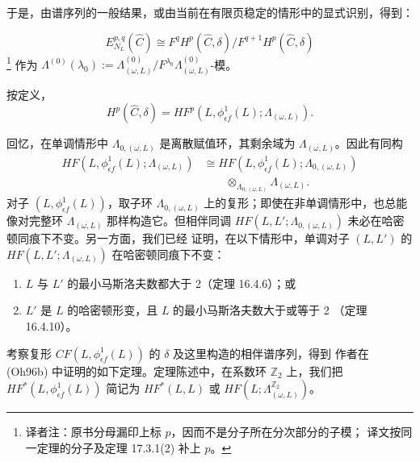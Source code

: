 于是，由谱序列的一般结果，或由当前在有限页稳定的情形中的显式识别，得到：

\begin{theorem}
\label{thm:finite-page-associated-graded}
\[
 E_{N_L}^{p,q}(\widehat C)\cong
 F^qH^p(\widehat C,\delta)/F^{q+1}H^p(\widehat C,\delta)
\]
\footnote{译者注：原书分母漏印上标 $p$，因而不是分子所在分次部分的子模；
译文按同一定理的分子及定理 17.3.1(2) 补上 $p$。}
作为
$\Lambda^{(0)}(\lambda_0):=\Lambda_{(\omega,L)}^{(0)}
/F^{\lambda_0}\Lambda_{(\omega,L)}^{(0)}$-模。
\end{theorem}

按定义，
\[
 H^p(\widehat C,\delta)=
 HF^p(L,\phi_{\epsilon f}^1(L);\Lambda_{(\omega,L)}).
\]

\begin{remark}
\label{rem:novikov-residue-field}
回忆，在单调情形中 $\Lambda_{0,(\omega,L)}$ 是离散赋值环，其剩余域为
$\Lambda_{(\omega,L)}$。因此有同构
\begin{equation}
 \begin{aligned}
 HF(L,\phi_{\epsilon f}^1(L);\Lambda_{(\omega,L)})
 &\cong HF(L,\phi_{\epsilon f}^1(L);\Lambda_{0,(\omega,L)})\\
 &\qquad\otimes_{\Lambda_{0,(\omega,L)}}\Lambda_{(\omega,L)}.
 \end{aligned}
\label{eq:17-novikov-base-change}
\end{equation}
对子 $(L,\phi_{\epsilon f}^1(L))$，取子环 $\Lambda_{0,(\omega,L)}$ 上的\personFloer{}复形；即使在非单调情形中，也总能像对完整\personNovikov{}环
$\Lambda_{(\omega,L)}$ 那样构造它。但相伴同调
$HF(L,L';\Lambda_{0,(\omega,L)})$ 未必在哈密顿同痕下不变。另一方面，我们已经
证明，在以下情形中，单调对子 $(L,L')$ 的
$HF(L,L';\Lambda_{(\omega,L)})$ 在哈密顿同痕下不变：
\begin{enumerate}[label=(\arabic*)]
\item $L$ 与 $L'$ 的最小马斯洛夫数都大于 2（定理 16.4.6）；或
\item $L'$ 是 $L$ 的哈密顿形变，且 $L$ 的最小马斯洛夫数大于或等于 2
（定理 16.4.10）。
\end{enumerate}
\end{remark}

考察复形 $CF(L,\phi_{\epsilon f}^1(L))$ 的 $\delta$ 及这里构造的相伴谱序列，得到
作者在 (Oh96b) 中证明的如下定理。定理陈述中，在系数环 $\mathbb Z_2$ 上，我们把
$HF^*(L,\phi_{\epsilon f}^1(L))$ 简记为 $HF^*(L,L)$ 或
$HF(L;\Lambda_{(\omega,L)}^{\mathbb Z_2})$。


